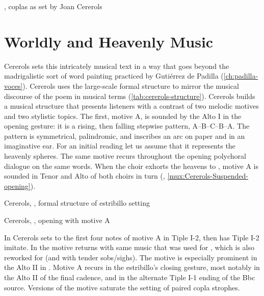 {, coplas as set by Joan Cererols}


\section{Worldly and Heavenly Music}

Cererols sets this intricately musical text in a way that goes beyond the
madrigalistic sort of word painting practiced by Gutiérrez de Padilla
(\cref{ch:padilla-voces}).
Cererols uses the large-scale formal structure to mirror the musical discourse
of the poem in musical terms (\cref{tab:cererols-structure}).
Cererols builds a musical structure that presents listeners with a contrast of
two melodic motives and two stylistic topics.
The first, motive A, is sounded by the Alto I in the opening gesture: it is a
rising, then falling stepwise pattern, A--B--C--B--A.
The pattern is symmetrical, palindromic, and inscribes an arc on paper and in an
imaginative ear.
For an initial reading let us assume that it represents the heavenly spheres.
The same motive recurs throughout the opening polychoral dialogue on the same
words.
When the choir exhorts the heavens to , motive A is
sounded in Tenor and Alto of both choirs in turn (,
\cref{mux:Cererols-Suspended-opening}).

{Cererols, , formal structure of estribillo setting}

{Cererols, , opening with motive A}

In  Cererols sets  to the
first four notes of motive A in Tiple I-2, then has Tiple I-2 imitate.
In  the motive returns with same music that was used for
, which is also reworked for  (and with tender sobs/sighs).
The motive is especially prominent in the Alto II in .
Motive A recurs in the estribillo's closing gesture, most notably in the Alto II
of the final cadence, and in the alternate Tiple I-1 ending of the Bbc source.
Versions of the motive saturate the setting of paired copla strophes.

